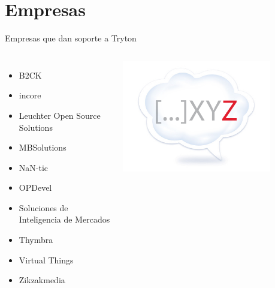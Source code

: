 
\section{Empresas}

	\begin{frame}{Empresas que dan soporte a Tryton}
	\fontsize{10}{11}\selectfont
        \begin{columns}
            \begin{itemize}
			\item B2CK
			\item incore
			\item Leuchter Open Source Solutions
			\item MBSolutions
			\item NaN-tic
			\item OPDevel
			\item Soluciones de Inteligencia de Mercados
			\item Thymbra
			\item Virtual Things
			\item Zikzakmedia
			\end{itemize}
            \vspace*{0.3cm}
            \begin{center}
            \includegraphics[width=0.8\textwidth]{./Images/zikzakmedia.png}
            \end{center}
            \vspace*{-0.5cm}

\end{columns}
\end{frame}
